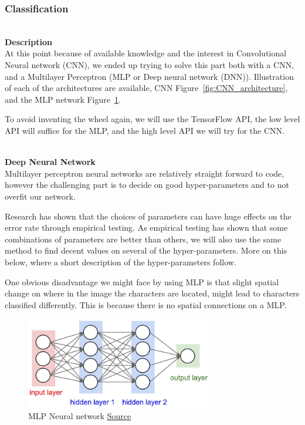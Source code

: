 \documentclass[11pt,a4paper,UKenglish]{article}
\begin{document}
\subsubsection{Classification}
\noindent \\ \textbf{Description}
\noindent \\ At this point because of available knowledge and the interest in
Convolutional Neural network (CNN), we ended up trying to solve this part
both with a CNN, and a Multilayer Perceptron (MLP or Deep neural network (DNN)).
Illustration of each of the architectures are available, CNN Figure~\ref{fig:CNN_architecture},
and the MLP network Figure~\ref{fig:neural_net2}. \par
To avoid inventing the wheel again, we will use the TensorFlow API, the low
level API will suffice for the MLP, and the high level API we will try for the
CNN.

\noindent \\ \textbf{Deep Neural Network}
\noindent \\ Multilayer perceptron neural networks are relatively straight
forward to code, however the challenging part is to decide on good
hyper-parameters and to not overfit our network. \par
Research has shown that the choices of parameters can have huge effects on
the error rate through empirical testing. As empirical testing has shown that
some combinations of parameters are better than others, we will also use the
same method to find decent values on several of the hyper-parameters. More on
this below, where a short description of the hyper-parameters follow. \par
One obvious disadvantage we might face by using MLP is that slight spatial
change on where in the image the characters are located, might lead to
characters classified differently. This is because there is no spatial
connections on a MLP.

\begin{figure}[H]
  \centering
  \includegraphics[height=4cm]{res/neural_net2.jpeg}
  \caption{MLP Neural network \href{http://cs231n.github.io/neural-networks-1/}{Source}}
  \label{fig:neural_net2}
\end{figure}
\end{document}
